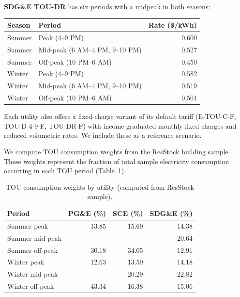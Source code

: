 \documentclass[11pt]{article}
\begin{document}
\textbf{SDG\&E TOU-DR} has six periods with a midpeak in both seasons:

\begin{table}[htbp]
\centering
\small
\begin{tabular}{l l r}
\toprule
\textbf{Season} & \textbf{Period} & \textbf{Rate (\$/kWh)} \\
\midrule
Summer & Peak (4--9 PM) & 0.600 \\
Summer & Mid-peak (6 AM--4 PM, 9--10 PM) & 0.527 \\
Summer & Off-peak (10 PM--6 AM) & 0.450 \\
Winter & Peak (4--9 PM) & 0.582 \\
Winter & Mid-peak (6 AM--4 PM, 9--10 PM) & 0.519 \\
Winter & Off-peak (10 PM--6 AM) & 0.501 \\
\bottomrule
\end{tabular}
\end{table}

Each utility also offers a fixed-charge variant of its default tariff (E-TOU-C-F, TOU-D-4-9-F, TOU-DR-F) with income-graduated monthly fixed charges and reduced volumetric rates. We include these as a reference scenario.

We compute TOU consumption weights from the ResStock building sample. These weights represent the fraction of total sample electricity consumption occurring in each TOU period (Table~\ref{tab:tou_weights}).

\begin{table}[htbp]
\centering
\caption{TOU consumption weights by utility (computed from ResStock sample).}
\label{tab:tou_weights}
\small
\begin{tabular}{l r r r}
\toprule
\textbf{Period} & \textbf{PG\&E (\%)} & \textbf{SCE (\%)} & \textbf{SDG\&E (\%)} \\
\midrule
Summer peak & 13.85 & 15.69 & 14.38 \\
Summer mid-peak & --- & --- & 20.64 \\
Summer off-peak & 30.18 & 34.05 & 12.91 \\
Winter peak & 12.63 & 13.59 & 14.18 \\
Winter mid-peak & --- & 20.29 & 22.82 \\
Winter off-peak & 43.34 & 16.38 & 15.06 \\
\bottomrule
\end{tabular}
\end{table}

\end{document}
